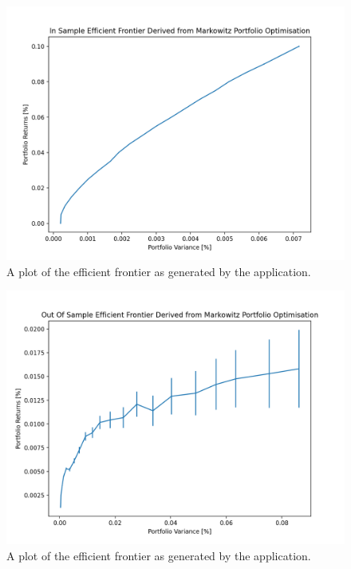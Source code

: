\documentclass{article}
\begin{document}
\begin{figure}[H]
	\centerline{\includegraphics[width=\textwidth]{figures/is_ef.png}}
	\label{is_ef}
	\caption{A plot of the efficient frontier as generated by the application.}
\end{figure}



\begin{figure}[H]
	\centerline{\includegraphics[width=\textwidth]{figures/oos_ef.png}}
	\label{oos_ef}
	\caption{A plot of the efficient frontier as generated by the application.}
\end{figure}
\end{document}
